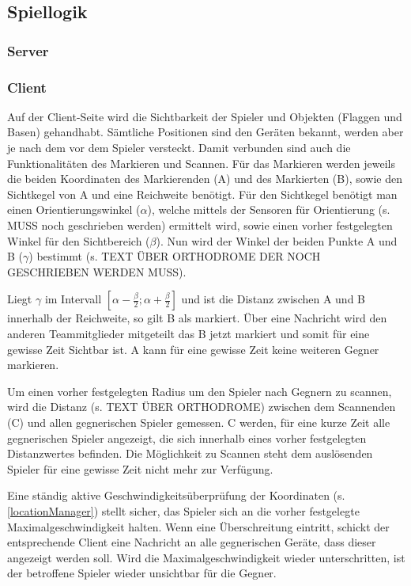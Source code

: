 \subsection{Spiellogik}

\subsubsection*{Server}


\subsubsection*{Client}
Auf der Client-Seite wird die Sichtbarkeit der Spieler und Objekten (Flaggen und Basen) gehandhabt. Sämtliche Positionen sind den Geräten bekannt, werden aber je nach dem vor dem Spieler versteckt. Damit verbunden sind auch die Funktionalitäten des Markieren und Scannen. Für das Markieren werden jeweils die beiden Koordinaten des Markierenden (A) und des Markierten (B), sowie den Sichtkegel von A und eine Reichweite benötigt. 
Für den Sichtkegel benötigt man einen Orientierungswinkel ($\alpha$), welche mittels der Sensoren für Orientierung (s. MUSS noch geschrieben werden) ermittelt wird, sowie einen vorher festgelegten Winkel für den Sichtbereich ($\beta$). Nun wird der Winkel der beiden Punkte A und B ($\gamma$) bestimmt (s. TEXT ÜBER ORTHODROME DER NOCH GESCHRIEBEN WERDEN MUSS).

Liegt $\gamma$ im Intervall $[ \alpha - \frac{\beta}{2}; \alpha + \frac{\beta}{2}]$ und ist die Distanz zwischen A und B innerhalb der Reichweite, so gilt B als markiert. Über eine Nachricht wird den anderen Teammitglieder mitgeteilt das B jetzt markiert und somit für eine gewisse Zeit Sichtbar ist. A kann für eine gewisse Zeit keine weiteren Gegner markieren.

Um einen vorher festgelegten Radius um den Spieler nach Gegnern zu scannen, wird die Distanz (s. TEXT ÜBER ORTHODROME) zwischen dem Scannenden (C) und allen gegnerischen Spieler gemessen. C werden, für eine kurze Zeit alle gegnerischen Spieler angezeigt, die sich innerhalb eines vorher festgelegten Distanzwertes befinden. Die Möglichkeit zu Scannen steht dem auslösenden Spieler für eine gewisse Zeit nicht mehr zur Verfügung.

Eine ständig aktive Geschwindigkeitsüberprüfung der Koordinaten (s. \ref{locationManager})  stellt sicher, das Spieler sich an die vorher festgelegte Maximalgeschwindigkeit halten. Wenn eine Überschreitung eintritt, schickt der entsprechende Client eine Nachricht an alle gegnerischen Geräte, dass dieser angezeigt werden soll. Wird die Maximalgeschwindigkeit wieder unterschritten, ist der betroffene Spieler wieder unsichtbar für die Gegner.




